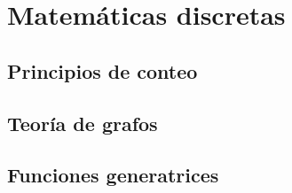 \chapter{Matemáticas discretas} %
\label{cha:matematicas-discretas}

\section{Principios de conteo} %
\label{sec:principios_de_conteo}

\section{Teoría de grafos} %
\label{sec:teoria_de_grafos}

\section{Funciones generatrices} %
\label{sec:funciones_generatrices}



